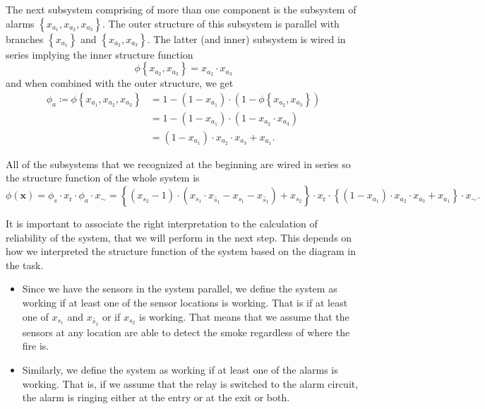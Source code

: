 The next subsystem comprising of more than one component is the subsystem of alarms \(\left\{ x_{a_1}, x_{a_2}, x_{a_3}
\right\}\). The outer structure of this subsystem is parallel with branches \(\left\{ x_{a_1} \right\}\) and \(\left\{
x_{a_2}, x_{a_3}\right\}\). The latter (and inner) subsystem is wired in series implying the inner structure function
\[
    \phi{\left\{ x_{a_2}, x_{a_3}\right\}} = x_{a_2}\cdot x_{a_3}
\] and when combined with the outer structure, we get \[
\begin{split}
    \phi_a \coloneqq \phi {\left\{ x_{a_1}, x_{a_2}, x_{a_3} \right\}} &=  1 - (1 - x_{a_1}) \cdot (1 - \phi{\left\{ x_{a_2}, x_{a_3} \right\}}) \\
    &= 1 - (1 - x_{a_1}) \cdot (1 - x_{a_2} \cdot x_{a_3}) \\
    &= (1 - x_{a_1}) \cdot x_{a_2}\cdot x_{a_3} + x_{a_1}.
\end{split}
\]

All of the subsystems that we recognized at the beginning are wired in series so the structure function of the whole
system is
\[
    \phi(\mathbf{x}) = \phi_s \cdot x_\text{r} \cdot \phi_a \cdot x_{\sim} = \left\{ (x_{s_2} - 1) \cdot (x_{s_1}\cdot
    x_{\tilde{s_1}} - x_{s_1} - x_{\tilde{s_1}}) + x_{s_2} \right\} \cdot x_\text{r} \cdot \left\{ (1 - x_{a_1}) \cdot
x_{a_2}\cdot x_{a_3} + x_{a_1} \right\} \cdot x_{\sim}.
\] 

\begin{note*}[interpretation]
  It is important to associate the right interpretation to the calculation of reliability of the system, that we will perform
  in the next step. This depends on how we interpreted the structure function of the system based on the diagram in the
  task. 

  \begin{itemize}
    \item Since we have the sensors in the system parallel, we define the system as working if at least one of the sensor locations is
        working. That is if at least one of \(x_{s_1}\) and \(x_{\tilde{s_1}}\) or if \(x_{s_2}\) is working. That means that we
        assume that the sensors at any location are able to detect the smoke regardless of where the fire is.

    \item Similarly, we define the system as working if at least one of the alarms is working. That is, if we assume that the
        relay is switched to the alarm circuit, the alarm is ringing either at the entry or at the exit or both. 
  \end{itemize}
\end{note*}

